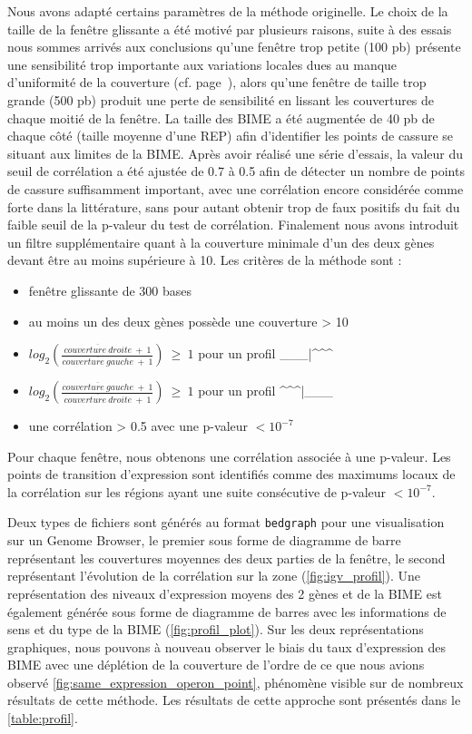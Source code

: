 \documentclass[12pt,a4paper]{report}
\begin{document}
\begin{onehalfspace}
Nous avons adapté certains paramètres de la méthode originelle. Le choix de la taille de la fenêtre glissante a été motivé par plusieurs raisons, suite à des essais nous sommes arrivés aux conclusions qu'une fenêtre trop petite (100 pb) présente une sensibilité trop importante aux variations locales dues au manque d'uniformité de la couverture (cf. page~\pageref{uniformite_couverture}), alors qu'une fenêtre de taille trop grande (500 pb) produit une perte de sensibilité en lissant les couvertures de chaque moitié de la fenêtre. La taille des BIME a été augmentée de 40 pb de chaque côté (taille moyenne d'une REP) afin d'identifier les points de cassure se situant aux limites de la BIME. Après avoir réalisé une série d'essais, la valeur du seuil de corrélation a été ajustée de 0.7 à 0.5 afin de détecter un nombre de points de cassure suffisamment important, avec une corrélation encore considérée comme forte dans la littérature, sans pour autant obtenir trop de faux positifs du fait du faible seuil de la p-valeur du test de corrélation. Finalement nous avons introduit un filtre supplémentaire quant à la couverture minimale d'un des deux gènes devant être au moins supérieure à 10. Les critères de la méthode sont :

\begin{itemize}[label=$\bullet$]
\item fenêtre glissante de 300 bases
\item au moins un des deux gènes possède une couverture > 10
\item $log_2(\frac{\overline{couverture~droite}~+~1}{\overline{couverture~gauche}~+~1})~\geq~1$ pour un profil \_\_\_|\^{ }\^{ }\^{ }
\item $log_2(\frac{\overline{couverture~gauche}~+~1}{\overline{couverture~droite}~+~1})~\geq~1$ pour un profil \^{ }\^{ }\^{ }|\_\_\_
\item une corrélation > 0.5 avec une p-valeur $< 10^{-7}$
\end{itemize}

Pour chaque fenêtre, nous obtenons une corrélation associée à une p-valeur. Les points de transition d’expression sont identifiés comme des maximums locaux de la corrélation sur les régions ayant une suite consécutive de p-valeur $< 10^{-7}$.

Deux types de fichiers sont générés au format \texttt{bedgraph} pour une visualisation sur un Genome Browser, le premier sous forme de diagramme de barre représentant les couvertures moyennes des deux parties de la fenêtre, le second représentant l'évolution de la corrélation sur la zone (\autoref{fig:igv_profil}). Une représentation des niveaux d'expression moyens des 2 gènes et de la BIME est également générée sous forme de diagramme de barres avec les informations de sens et du type de la BIME (\autoref{fig:profil_plot}). Sur les deux représentations graphiques, nous pouvons à nouveau observer le biais du taux d'expression des BIME avec une déplétion de la couverture de l'ordre de ce que nous avions observé \autoref{fig:same_expression_operon_point}, phénomène visible sur de nombreux résultats de cette méthode. Les résultats de cette approche sont présentés dans le \autoref{table:profil}.


\end{onehalfspace}
\end{document}
